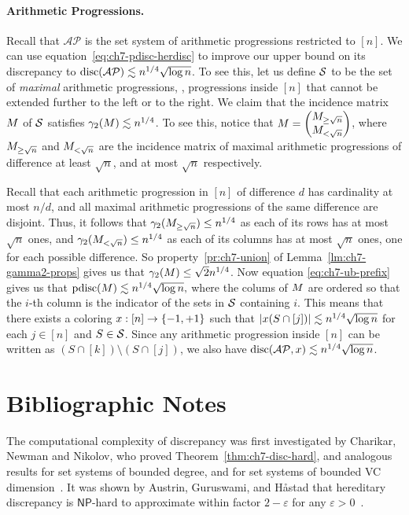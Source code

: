 \paragraph{Arithmetic Progressions.} Recall that $\mathcal{AP}$ is the
set system of arithmetic progressions restricted to $[n]$. We can use
equation~\eqref{eq:ch7-pdisc-herdisc} to improve our upper bound on
its discrepancy to $\operatorname{disc}(\mathcal{AP}) \lesssim n^{1/4}\sqrt{\log
  n}$. To see this, let us define $\mathcal{S}$ to be the set of
\emph{maximal} arithmetic progressions, \ie, progressions inside $[n]$
that cannot be extended further to the left or to the right. We claim
that the incidence matrix $M$ of $\mathcal{S}$ satisfies $\gamma_2(M)
\lesssim n^{1/4}$. To see this, notice that
\(
M =
\begin{pmatrix}
  M_{\ge \sqrt{n}}\\
  M_{< \sqrt{n}}
\end{pmatrix}
\), where $M_{\ge \sqrt{n}}$ and $M_{< \sqrt{n}}$ are the incidence matrix of maximal
arithmetic progressions of difference at least $\sqrt{n}$, and at most $\sqrt{n}$  respectively. 

Recall that each arithmetic progression in $[n]$ of difference $d$ has
cardinality at most $n/d$, and all maximal arithmetic
progressions of the same difference are disjoint. Thus, it follows that $\gamma_2(M_{\ge \sqrt{n}}) \le n^{1/4}$ as each of its rows has at
most $\sqrt{n}$ ones, and $\gamma_2(M_{<\sqrt{n}}) \le n^{1/4}$
as each of its columns has at most $\sqrt{n}$ ones, one for each
possible difference. So  property~\ref{pr:ch7-union} of
Lemma~\ref{lm:ch7-gamma2-props} gives us that $\gamma_2(M)\le
\sqrt{2} n^{1/4}$.  Now equation
\eqref{eq:ch7-ub-prefix} gives us that
\(
\operatorname{pdisc}(M) \lesssim n^{1/4} \sqrt{\log n},
\)
where the colums of $M$ are ordered so that the $i$-th column is
the indicator of the sets in $\mathcal{S}$ containing $i$. This means that
there exists a coloring $x:[n]\to \{-1,+1\}$ such that $|x(S
\cap [j])| \lesssim n^{1/4} \sqrt{\log n}$ for each $j \in [n]$ and $S
\in \mathcal{S}$. Since any arithmetic progression inside $[n]$ can be written
as $(S \cap [k]) \setminus (S \cap [j])$, we also have
$\operatorname{disc}(\mathcal{AP},x) \lesssim n^{1/4}\sqrt{\log n}$.

\section{Bibliographic Notes}

The computational complexity of discrepancy was first investigated by
Charikar, Newman and Nikolov, who proved
Theorem~\ref{thm:ch7-disc-hard}, and analogous results for set systems
of bounded degree, and for set systems of bounded VC
dimension~\cite{dischard}. It was shown by Austrin, Guruswami, and
H{\aa}stad that hereditary discrepancy is $\mathsf{NP}$-hard to
approximate within factor $2-\varepsilon$ for any
$\varepsilon > 0$~\cite{AustrinGH13}. 

